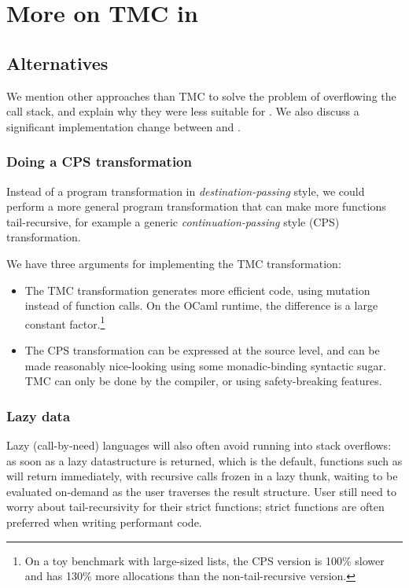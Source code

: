 \section{More on TMC in \OCaml}
\label{app:more-ocaml}

\subsection{Alternatives}
\label{subsec:alternative-impls}

We mention other approaches than TMC to solve the problem of overflowing the call stack, and explain why they were less suitable for \OCaml. We also discuss a significant implementation change between  and .

\subsubsection{Doing a CPS transformation}

Instead of a program transformation in \emph{destination-passing} style, we could perform a more general program transformation that can make more functions tail-recursive, for example a generic \emph{continuation-passing} style (CPS) transformation.

We have three arguments for implementing the TMC transformation:
\begin{itemize}
\item The TMC transformation generates more efficient code, using mutation instead of function calls. On the OCaml runtime, the difference is a large constant factor.\footnote{On a toy benchmark with large-sized lists, the CPS version is 100\% slower and has 130\% more allocations than the non-tail-recursive version.}

\item The CPS transformation can be expressed at the source level, and can be made reasonably nice-looking using some monadic-binding syntactic sugar. TMC can only be done by the compiler, or using safety-breaking features.
\end{itemize}

\subsubsection{Lazy data}

Lazy (call-by-need) languages will also often avoid running into stack overflows: as soon as a lazy datastructure is returned, which is the default, functions such as  will return immediately, with recursive calls frozen in a lazy thunk, waiting to be evaluated on-demand as the user traverses the result structure.
User still need to worry about tail-recursivity for their strict functions; strict functions are often preferred when writing performant code.

